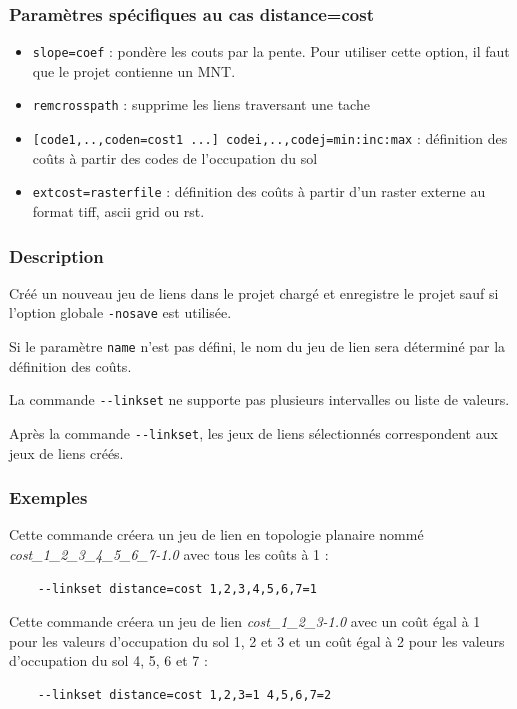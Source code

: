 \documentclass[a4paper,10pt]{report}
\begin{document}
\subsubsection{Paramètres spécifiques au cas distance=cost}
\begin{itemize}
	\item \verb|slope=coef| : pondère les couts par la pente. Pour utiliser cette option, il faut que le projet contienne un MNT.
	\item \verb|remcrosspath| : supprime les liens traversant une tache
	\item \verb|[code1,..,coden=cost1 ...] codei,..,codej=min:inc:max| : définition des coûts à partir des codes de l'occupation du sol
	\item \verb|extcost=rasterfile| : définition des coûts à partir d'un raster externe au format tiff, ascii grid ou rst.
\end{itemize}

\subsubsection{Description}
Créé un nouveau jeu de liens dans le projet chargé et enregistre le projet sauf si l'option globale \verb|-nosave| est utilisée.

Si le paramètre \verb|name| n'est pas défini, le nom du jeu de lien sera déterminé par la définition des coûts.

La commande \verb|--linkset| ne supporte pas plusieurs intervalles ou liste de valeurs.

Après la commande \verb|--linkset|, les jeux de liens sélectionnés correspondent aux jeux de liens créés.

\subsubsection{Exemples}
Cette commande créera un jeu de lien en topologie planaire nommé \textit{cost\_1\_2\_3\_4\_5\_6\_7-1.0} avec tous les coûts à 1 :
\begin{Verbatim}
	--linkset distance=cost 1,2,3,4,5,6,7=1
\end{Verbatim}

Cette commande créera un jeu de lien \textit{cost\_1\_2\_3-1.0} avec un coût égal à 1 pour les valeurs d'occupation du sol 1, 2 et 3 et un coût égal à 2 pour les valeurs d'occupation du sol 4, 5, 6 et 7 :
\begin{Verbatim}
	--linkset distance=cost 1,2,3=1 4,5,6,7=2
\end{Verbatim}
\end{document}
